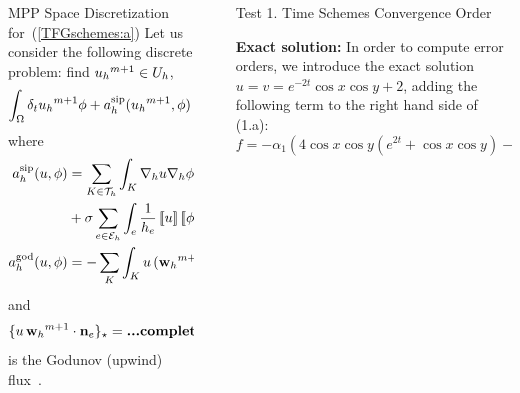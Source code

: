 \documentclass[final]{beamer}
\newlength{\sepwid}
\newlength{\onecolwid}
\begin{document}
\begin{frame}[t]
\begin{columns}[t]
\begin{column}{\onecolwid}
\begin{block}{MPP Space Discretization for~(\ref{TFGschemes:a})}
        Let us consider the following discrete problem: find
        ${{u_{h}}^{m+1}}\in U_h$,
        \begin{equation}
        \label{discrete_problem_u}
          \int_\Omega \delta_t{{u_{h}}^{m+1}} \phi + a_h^{\mathrm{sip}}({{u_{h}}^{m+1}},\phi) + a_h^{\mathrm{god}}({{u_{h}}^{m+1}},\phi)=0 \quad \forall\phi\in U_h,
        \end{equation}
        where
        \begin{align*}
          \asip(u,\phi) &= \sum_{K\in\mathcal{T}_h}\int_K\nabla_h u\nabla_h \phi-\sum_{e\in\mathcal{E}_h}\int_e\left(\average{\nabla_h u\cdot\mathbf{n}_e}\jump{\phi}+\average{\nabla_h \phi\cdot\mathbf{n}_e}\jump{u}\right)\\&+\sigma\sum_{e\in\mathcal{E}_h}\int_e\frac{1}{h_e}\jump{u}\jump{\phi},
          \\
          \agod(u,\phi) &= -\sum_K \int_K u \, (\wwmm\cdot \grad\phi)
                            + \sum_{e\in\Eh}\{ u \, \wwmm \cdot \nn_e\}_\star
        \end{align*}
        and
        $$
        \{ u \, {{\mathbf{w}_{h}}^{m+1}} \cdot \mathbf{n}_e\}_\star=\textbf{...completar...}
        $$
        is the Godunov (upwind) flux~\cite{anderson_high-order_2017}.

      \end{block}

    \end{column}



    \begin{column}{\sepwid}  \end{column}

    \vspace*{0.5cm}

    \begin{column}{\onecolwid} %

      \begin{block}{Test 1. Time Schemes Convergence Order}

        {\small
          \textbf{Exact solution:} In order to compute error orders, we introduce the exact solution $u=v=e^{-2t}\cos{x}\cos{y}+2$, adding the following term to the right hand side of (1.a):
          $$f=-\alpha_1 (4\cos{x}\cos{y}(e^{2t}+\cos{x}\cos{y})-\cos^2{x}-\cos^2{y})e^{-4t}.$$

}
\end{block}
\end{column}
\end{columns}
\end{frame}
\end{document}

